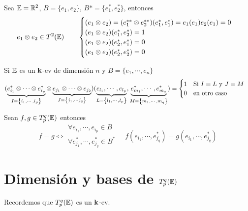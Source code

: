 \begin{example}
	Sea $\mathbb{E} = \mathbb{R}^2$, $B = \{e_1, e_2\}$, $B* = \{e_1^*, e_2^*\}$, entonces
	\[
		e_1 \otimes e_2 \in T^2(\mathbb{E}) \qquad \begin{cases}
			(e_1 \otimes e_2) = (e_1^{**} \otimes e_2^{**})(e_1^*,e_1^*) =
			e_1(e_1)e_2(e_1) = 0 \\
			(e_1 \otimes e_2)(e_1^*,e_2^*) = 1 \\
			(e_1 \otimes e_2)(e_2^*,e_1^*) = 0 \\
			(e_1 \otimes e_2)(e_2^*,e_2^*) = 0
		\end{cases}
	\]
\end{example}
\begin{obs} \label{obs:tens_cero}
	Si $\mathbb{E}$ es un $\mathbf{k}$-ev de dimensión $n$ y $B = \{e_1, \cdots, e_n\}$
	\[
		(\underbrace{e_{i_1}^* \otimes \cdots \otimes e_{i_p}^*}_
		{I = \left\{i_1, \cdots, i_p\right\}} \otimes
		\underbrace{e_{j_1} \otimes \cdots \otimes e_{j_2}}_
		{J = \left\{j_1, \cdots j_q\right\}})(\underbrace{e_{l_1}, \cdots, e_{l_p}}_
		{L = \left\{l_1, \cdots, l_p\right\}}, \underbrace{e_{m_1}^*, \cdots, e_{m_q}^*}_
		{M = \left\{m_1, \cdots, m_q\right\}}) =
		\begin{cases}
			1 \quad \text{Si } I = L \text{ y } J = M \\
			0 \quad \text{en otro caso}
		\end{cases}
	\]
\end{obs}
\begin{obs}
	Sean $f,g \in T_p^q(\mathbb{E})$ entonces
	\[
		f=g \iff \substack{\forall e_{i_1}, \cdots, e_{i_p} \in B \\ \forall e_{j_1}^*, \cdots,
		e_{j_q}^* \in B^*} \quad f(e_{i_1}, \cdots, e_{j_q}^*) =
		g(e_{i_1}, \cdots, e_{j_q}^*)
	\]
\end{obs}

\section{Dimensión y bases de $T_p^q(\mathbb{E})$}

Recordemos que $T_p^q(\mathbb{E})$ es un $\mathbf{k}$-ev.

